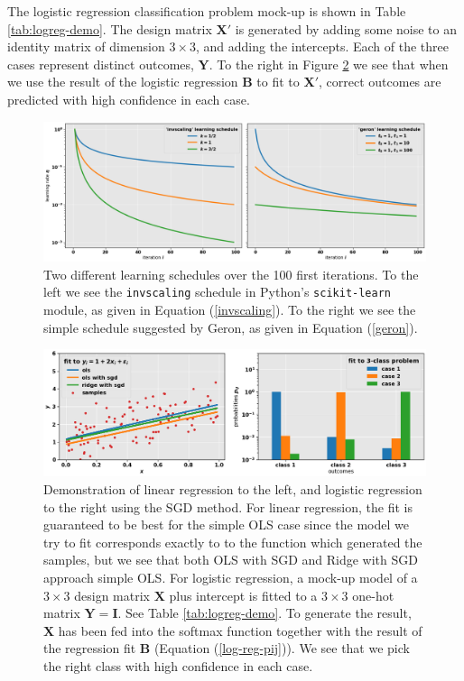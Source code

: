 \documentclass[]{article}
\begin{document}
The logistic regression classification problem mock-up is shown in Table \ref{tab:logreg-demo}. The design matrix $\mathbf{X}'$ is generated by adding some noise to an identity matrix of dimension $3 \times 3$, and adding the intercepts. Each of the three cases represent distinct outcomes, $\mathbf{Y}$. To the right in Figure \ref{fig:demo_lin_log_reg} we see that when we use the result of the logistic regression $\mathbf{B}$ to fit to $\mathbf{X}'$, correct outcomes are predicted with high confidence in each case.

\begin{figure}[!htb]
	\centering
	\includegraphics[width=1\linewidth]{learning_schedules.png}
	\caption{Two different learning schedules over the 100 first iterations. To the left we see the \lstinline|invscaling| schedule in Python's \lstinline|scikit-learn| module, as given in Equation (\ref{invscaling}). To the right we see the simple schedule suggested by Geron, as given in Equation (\ref{geron}).}
	\label{fig:learning_schedules}
\end{figure}

\begin{figure}[!htb]
	\centering
	\includegraphics[width=1\linewidth]{demo_lin_log_reg.png}
	\caption{Demonstration of linear regression to the left, and logistic regression to the right using the SGD method. For linear regression, the fit is guaranteed to be best for the simple OLS case since the model we try to fit corresponds exactly to to the function which generated the samples, but we see that both OLS with SGD and Ridge with SGD approach simple OLS. For logistic regression, a mock-up model of a $3 \times 3$ design matrix $\mathbf{X}$ plus intercept is fitted to a $3 \times 3$ one-hot matrix $\mathbf{Y} = \mathbf{I}$. See Table \ref{tab:logreg-demo}. To generate the result, $\mathbf{X}$ has been fed into the softmax function together with the result of the regression fit $\mathbf{B}$ (Equation (\ref{log-reg-pij})). We see that we pick the right class with high confidence in each case.}
	\label{fig:demo_lin_log_reg}
\end{figure}
\end{document}
